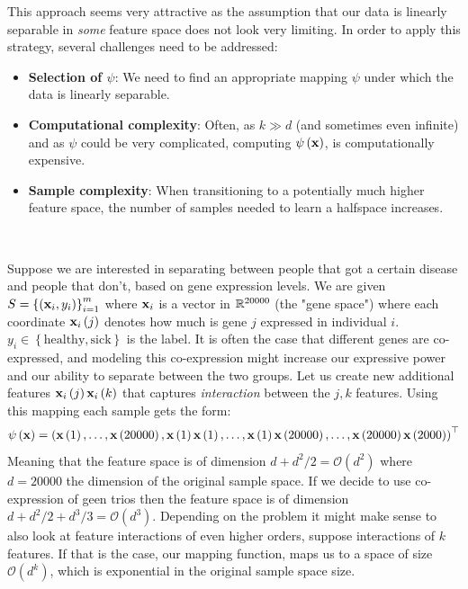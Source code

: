 This approach seems very attractive as the assumption that our data is linearly separable in \textit{some} feature space does not look very limiting. In order to apply this strategy, several challenges need to be addressed:
\begin{itemize}
	\item \textbf{Selection of $\psi$}: We need to find an appropriate mapping $\psi$ under which the data is linearly separable.
	\item \textbf{Computational complexity}:  Often, as $k\gg d$ (and sometimes even infinite) and as $\psi$ could be very complicated, computing $\psi\left(\mathbf{x}\right)$, is computationally expensive.
	\item \textbf{Sample complexity}: When transitioning to a potentially much higher feature space, the number of samples needed to learn a halfspace increases. 
\end{itemize}
~\\
\begin{example}
	Suppose we are interested in separating between people that got a certain disease and people that don't, based on gene expression levels. We are given $S=\left\{\left(\mathbf{x}_i,y_i\right)\right\}^m_{i=1}$ where $\mathbf{x}_i$ is a vector in $\mathbb{R}^{20000}$ (the "gene space") where each coordinate $\mathbf{x}_i\left(j\right)$ denotes how much is gene $j$ expressed in individual $i$. $y_i\in\left\{\text{healthy},\text{sick}\right\}$ is the label. It is often the case that different genes are co-expressed, and modeling this co-expression might increase our expressive power and our ability to separate between the two groups. Let us create new additional features $\mathbf{x}_i\left(j\right)\mathbf{x}_i\left(k\right)$ that captures \textit{interaction} between the $j,k$ features. Using this mapping each sample gets the form: $$ \psi\left(\mathbf{x}\right) = \left(\mathbf{x}\left(1\right),\ldots,\mathbf{x}\left(20000\right),\mathbf{x}\left(1\right)\mathbf{x}\left(1\right),\ldots,\mathbf{x}\left(1\right)\mathbf{x}\left(20000\right),\ldots,\mathbf{x}\left(20000\right)\mathbf{x}\left(2000\right)\right)^\top $$ 
	Meaning that the feature space is of dimension $d+d^2/2=\mathcal{O}\left(d^2\right)$ where $d=20000$ the dimension of the original sample space. If we decide to use co-expression of geen trios then the feature space is of dimension $d+d^2/2 + d^3/3=\mathcal{O}\left(d^3\right)$. Depending on the problem it might make sense to also look at feature interactions of even higher orders, suppose interactions of $k$ features. If that is the case, our mapping function, maps us to a space of size $\mathcal{O}\left(d^k\right)$, which is exponential in the original sample space size.
\end{example}


